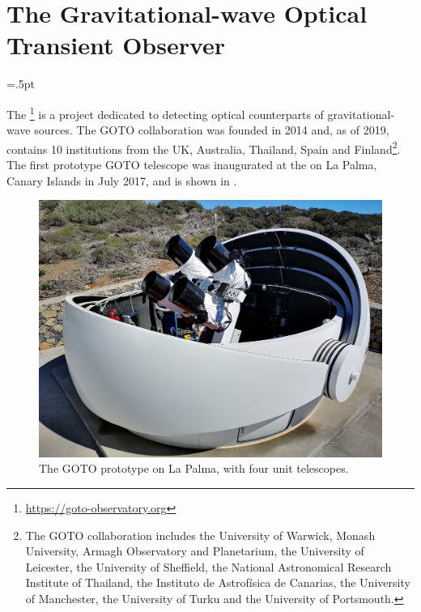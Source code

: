 
\hfuzz=6pt %
\section{The Gravitational-wave Optical Transient Observer}
\hfuzz=.5pt %
\label{sec:goto}


\begin{colsection}

The \footnote{\url{https://goto-observatory.org}} is a project dedicated to detecting optical counterparts of gravitational-wave sources. The GOTO collaboration was founded in 2014 and, as of 2019, contains 10 institutions from the UK, Australia, Thailand, Spain and Finland\footnote{The GOTO collaboration includes the University of Warwick, Monash University, Armagh Observatory and Planetarium, the University of Leicester, the University of Sheffield, the National Astronomical Research Institute of Thailand, the Instituto de Astrofísica de Canarias, the University of Manchester, the University of Turku and the University of Portsmouth.}. The first prototype GOTO telescope was inaugurated at the  on La Palma, Canary Islands in July 2017, and is shown in .

\begin{figure}[p]
    \begin{center}
        \includegraphics[width=0.9\linewidth]{images/goto_photo.jpg}
    \end{center}
    \caption[The GOTO prototype on La Palma]{
        The GOTO prototype on La Palma, with four unit telescopes.
    }\label{fig:goto_photo}
\end{figure}


\end{colsection}
